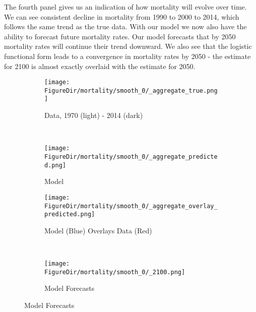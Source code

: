 \documentclass[10pt]{article}
\renewcommand{\thesection}{\arabic{section}}
\renewcommand{\thesubsection}{\thesection.\arabic{subsection}}
\renewcommand{\thesubsubsection}{\thesubsection.\arabic{subsubsection}}
\renewcommand{\subsubsection}[2][]{\oldsubsubsection[#1]{#2}\index{#1}\label{sec:\thesubsubsection}}
\numberwithin{equation}{subsection}
\newcommand*{\FigureDir}{../../graphs}
\begin{document}
\par The fourth panel gives us an indication of how mortality will evolve over time. We can see consistent decline in mortality from 1990 to 2000 to 2014, which follows the same trend as the true data. With our model we now also have the ability to forecast future mortality rates. Our model forecasts that by 2050 mortality rates will continue their trend downward. We also see that the logistic functional form leads to a convergence in mortality rates by 2050 - the estimate for 2100 is almost exactly overlaid with the estimate for 2050.

\begin{figure}[!ht]
   \centering
   \caption{\label{fig:\thesubsubsection.4}Mortality Generalized Beta 2 Model Fit}
   \begin{subfigure}{0.5\textwidth}
      \centering
      \texttt{[image: \\FigureDir/mortality/smooth\_0/\_aggregate\_true.png]}
      \caption{Data, 1970 (light) - 2014 (dark)}
   \end{subfigure}%
   ~ %
   \begin{subfigure}{0.5\textwidth}
      \centering
      \texttt{[image: \\FigureDir/mortality/smooth\_0/\_aggregate\_predicted.png]}
      \caption{Model}
   \end{subfigure}%
   \newline
   \begin{subfigure}{0.5\textwidth}
      \centering
      \texttt{[image: \\FigureDir/mortality/smooth\_0/\_aggregate\_overlay\_predicted.png]}
      \caption{Model (Blue) Overlays Data (Red)}
   \end{subfigure}%
   ~ %
   \begin{subfigure}{0.5\textwidth}
      \centering
      \texttt{[image: \\FigureDir/mortality/smooth\_0/\_2100.png]}
      \caption{Model Forecasts}
   \end{subfigure}%
\end{figure}


\subsubsection{Immigration Rates}
\end{document}
